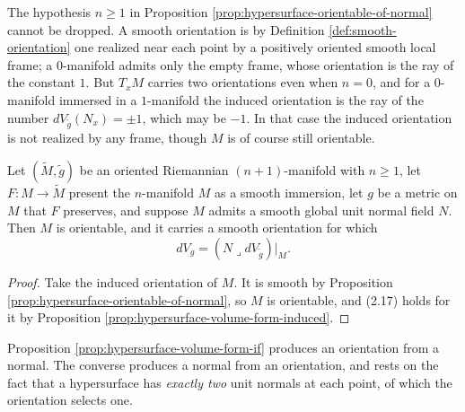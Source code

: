 \begin{remark}
\label{rem:hypersurface-orientation-dimension}
The hypothesis $n \geq 1$ in Proposition \ref{prop:hypersurface-orientable-of-normal} cannot be
dropped. A smooth orientation is by Definition \ref{def:smooth-orientation} one realized near each
point by a positively oriented smooth local frame; a $0$-manifold admits only the empty frame,
whose orientation is the ray of the constant $1$. But $T_x M$ carries two orientations even when
$n = 0$, and for a $0$-manifold immersed in a $1$-manifold the induced orientation is the ray of
the number $dV_{\tilde g}(N_x) = \pm 1$, which may be $-1$. In that case the induced orientation
is not realized by any frame, though $M$ is of course still orientable.
\end{remark}

\begin{proposition}
\label{prop:hypersurface-volume-form-if}
\leanok
{}
Let $(\tilde M, \tilde g)$ be an oriented Riemannian $(n+1)$-manifold with $n \geq 1$, let
$F : M \to \tilde M$ present the $n$-manifold $M$ as a smooth immersion, let $g$ be a metric on
$M$ that $F$ preserves, and suppose $M$ admits a smooth global unit normal field $N$. Then $M$ is
orientable, and it carries a smooth orientation for which
\[
  dV_g = (N \lrcorner dV_{\tilde{g}})|_M. \tag{2.17}
\]
\end{proposition}

\begin{proof}
\leanok
{}
Take the induced orientation of $M$. It is smooth by Proposition
\ref{prop:hypersurface-orientable-of-normal}, so $M$ is orientable, and (2.17) holds for it by
Proposition \ref{prop:hypersurface-volume-form-induced}.
\end{proof}

Proposition \ref{prop:hypersurface-volume-form-if} produces an orientation from a normal. The
converse produces a normal from an orientation, and rests on the fact that a hypersurface has
\emph{exactly two} unit normals at each point, of which the orientation selects one.

